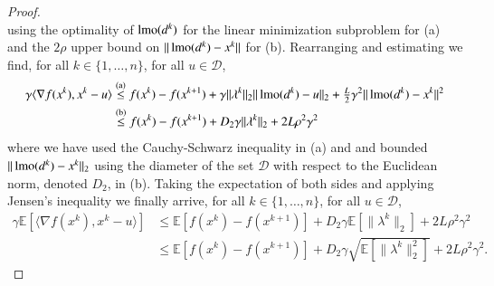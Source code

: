 \begin{toappendix}
\begin{proof}
\begin{equation*}
    \end{equation*}
    using the optimality of $\operatorname{lmo}(d^k)$ for the linear minimization subproblem for (a) and the $2\rho$ upper bound on $\|\operatorname{lmo}(d^k)-x^k\|$ for (b).
    Rearranging and estimating we find, for all $k\in\{1,\ldots,n\}$, for all $u\in\mathcal{D}$,
    \begin{equation*}
        \begin{aligned}
            \gamma\langle \nabla f(x^k),x^k-u\rangle
                &\stackrel{\text{(a)}}{\leq} f(x^k) - f(x^{k+1}) + \gamma \| \lambda^k\|_2 \|\operatorname{lmo}(d^k)-u\|_2 + \tfrac{L}{2}\gamma^2\|\operatorname{lmo}(d^k)-x^k\|^2\\
                &\stackrel{\text{(b)}}{\leq} f(x^k) - f(x^{k+1}) + D_2 \gamma \| \lambda^k\|_2  + 2L\rho^2\gamma^2
        \end{aligned}
    \end{equation*}
    where we have used the Cauchy-Schwarz inequality in (a) and and bounded $\|\operatorname{lmo}(d^k)-x^k\|_2$ using the diameter of the set $\mathcal{D}$ with respect to the Euclidean norm, denoted $D_2$, in (b).
    Taking the expectation of both sides and applying Jensen's inequality we finally arrive, for all $k\in\{1,\ldots,n\}$, for all $u\in\mathcal{D}$,
    \begin{equation*}
        \begin{aligned}
            \gamma\mathbb{E}[\langle \nabla f(x^k),x^k-u\rangle]
                &\leq \mathbb{E}[f(x^k) - f(x^{k+1})] + D_2 \gamma \mathbb{E}[\| \lambda^k\|_2] + 2L\rho^2\gamma^2\\
                &\leq \mathbb{E}[f(x^k) - f(x^{k+1})] + D_2 \gamma \sqrt{\mathbb{E}[\| \lambda^k\|_2^2]} + 2L\rho^2\gamma^2.
        \end{aligned}
    \end{equation*}
\end{proof}


\end{toappendix}
